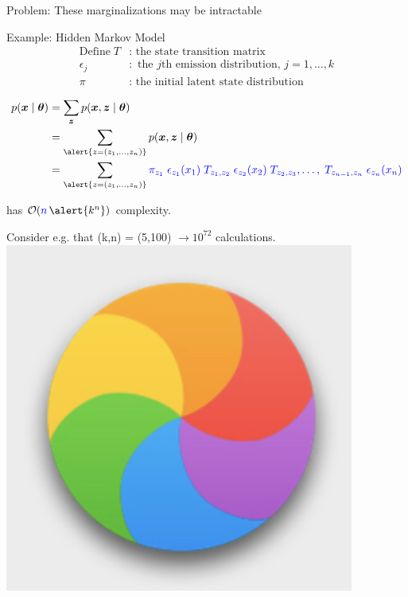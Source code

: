 \documentclass[10pt]{beamer}
\newcommand\warning{%
 \makebox[1.4em][c]{%
 \makebox[0pt][c]{\raisebox{.1em}{\small!}}%
 \makebox[0pt][c]{\color{red}\Large$\bigtriangleup$}}}%
\newcommand{\ds}{\displaystyle}
\newcommand{\+}[1]{\ensuremath{{\boldsymbol #1}}} %
\newcommand{\cond}{\; | \;}
\newcommand{\blue}[1]{\color{blue}{#1}  \color{black}}
\begin{document}
\begin{frame}{Problem:  These marginalizations may be intractable}

 
\begin{block}{Example: Hidden Markov Model}
\begin{align*}
\text{Define} \; T &: \text{ the state transition matrix} \\
\epsilon_j &: \text{ the $j$th emission distribution, $j=1,...,k$} \\
\pi &: \text{ the initial latent state distribution}
\end{align*}


\begin{align*}
p(\+x \cond \+\theta) &= \ds\sum_\+z p(\+x, \+z \cond \+\theta) \\
&= \ds\sum_{ \alert{z=(z_1,\hdots, z_n)}} p(\+x, \+z \cond \+\theta) \\
&= \ds\sum_{ \alert{z=(z_1,\hdots, z_n)}} { \blue{\pi_{z_1} \; \epsilon_{z_1}(x_1) \; T_{z_1,z_2} \; \epsilon_{z_2} (x_2) \; T_{z_2, z_3}, \hdots, \; T_{z_{n-1}, z_n} \; \epsilon_{z_n}(x_n)}}
\end{align*}

has $\mathcal{O}(\blue{n} \, \alert{k^n})$ complexity.  \warning 
\end{block}

Consider e.g. that (k,n) = (5,100) $ \rightarrow 10^{72}$ calculations.  \includegraphics[height=.05\textheight]{images/spinning_wheel.png}

\end{frame}
\end{document}
